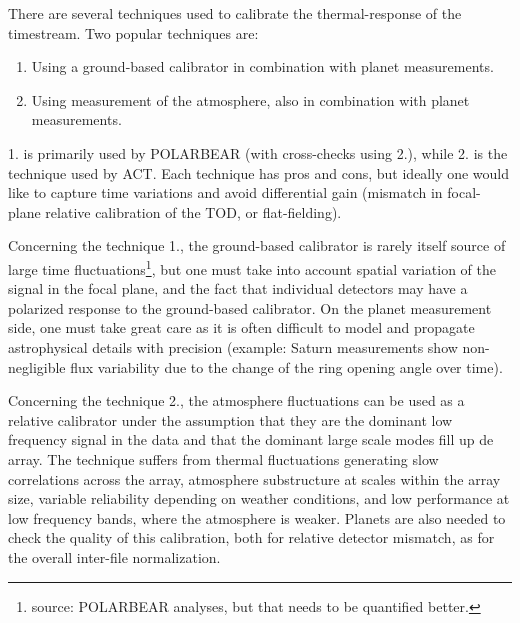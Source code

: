 There are several techniques used to calibrate the thermal-response of the timestream. Two popular techniques are: 
\begin{enumerate}
\item{Using a ground-based calibrator in combination with planet measurements.}
\item{Using measurement of the atmosphere, also in combination with planet measurements.}
\end{enumerate}
1. is primarily used by POLARBEAR (with cross-checks using 2.), while 2. is the technique used by ACT. Each technique has pros and cons, but ideally one would like to capture time variations and avoid differential gain (mismatch in focal-plane relative calibration of the TOD, or flat-fielding).

Concerning the technique 1., the ground-based calibrator is rarely itself source of large time fluctuations\footnote{source: POLARBEAR analyses, but that needs to be quantified better.}, but one must take into account spatial variation of the signal in the focal plane, and the fact that individual detectors may have a polarized response to the ground-based calibrator.
On the planet measurement side, one must take great care as it is often difficult to model and propagate astrophysical details with precision (example: Saturn measurements show non-negligible flux variability due to the change of the ring opening angle over time).

Concerning the technique 2., the atmosphere fluctuations can be used as a relative calibrator under the assumption that they are the dominant low frequency signal in the data and that the dominant large scale modes fill up de array. The technique suffers from thermal fluctuations generating slow correlations across the array, atmosphere substructure at scales within the array size, variable reliability depending on weather conditions, and low performance at low frequency bands, where the atmosphere is weaker.
Planets are also needed to check the quality of this calibration, both for relative detector mismatch, as for the overall inter-file normalization.


